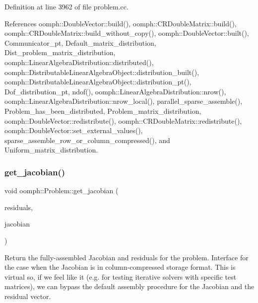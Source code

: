 Definition at line 3962 of file problem.\+cc.



References oomph\+::\+Double\+Vector\+::build(), oomph\+::\+C\+R\+Double\+Matrix\+::build(), oomph\+::\+C\+R\+Double\+Matrix\+::build\+\_\+without\+\_\+copy(), oomph\+::\+Double\+Vector\+::built(), Communicator\+\_\+pt, Default\+\_\+matrix\+\_\+distribution, Dist\+\_\+problem\+\_\+matrix\+\_\+distribution, oomph\+::\+Linear\+Algebra\+Distribution\+::distributed(), oomph\+::\+Distributable\+Linear\+Algebra\+Object\+::distribution\+\_\+built(), oomph\+::\+Distributable\+Linear\+Algebra\+Object\+::distribution\+\_\+pt(), Dof\+\_\+distribution\+\_\+pt, ndof(), oomph\+::\+Linear\+Algebra\+Distribution\+::nrow(), oomph\+::\+Linear\+Algebra\+Distribution\+::nrow\+\_\+local(), parallel\+\_\+sparse\+\_\+assemble(), Problem\+\_\+has\+\_\+been\+\_\+distributed, Problem\+\_\+matrix\+\_\+distribution, oomph\+::\+Double\+Vector\+::redistribute(), oomph\+::\+C\+R\+Double\+Matrix\+::redistribute(), oomph\+::\+Double\+Vector\+::set\+\_\+external\+\_\+values(), sparse\+\_\+assemble\+\_\+row\+\_\+or\+\_\+column\+\_\+compressed(), and Uniform\+\_\+matrix\+\_\+distribution.

\mbox{\label{classoomph_1_1Problem_a9e6c6d71f95d96943a1a8487b6131e89}} 
\subsubsection{\texorpdfstring{get\+\_\+jacobian()}{get\_jacobian()}\hspace{0.1cm}{\footnotesize\ttfamily [3/4]}}
{\footnotesize\ttfamily void oomph\+::\+Problem\+::get\+\_\+jacobian (\begin{DoxyParamCaption}\item[{\hyperlink{classoomph_1_1DoubleVector}{Double\+Vector} \&}]{residuals,  }\item[{\hyperlink{classoomph_1_1CCDoubleMatrix}{C\+C\+Double\+Matrix} \&}]{jacobian }\end{DoxyParamCaption})\hspace{0.3cm}{\ttfamily [virtual]}}



Return the fully-\/assembled Jacobian and residuals for the problem. Interface for the case when the Jacobian is in column-\/compressed storage format. This is virtual so, if we feel like it (e.\+g. for testing iterative solvers with specific test matrices), we can bypass the default assembly procedure for the Jacobian and the residual vector. 

